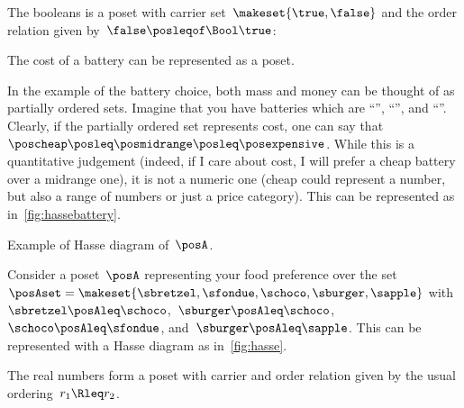 \begin{example}[Booleans]
    \label{ex:bool}
    The booleans \index{\Bool} is a poset with carrier set~$\makeset{\true,\false}$ and the order relation given by~$\false \posleqof\Bool \true$:
\end{example}

\begin{example}

    \begin{marginfigure}
        \centering
        \caption{The cost of a battery can be represented as a poset.
        }
        \label{fig:hassebattery}
    \end{marginfigure}

    In the example of the battery choice, both mass and money can be thought of as partially ordered sets.
    Imagine that you have batteries which are ``\poscheap'', ``\posmidrange'', and ``\posexpensive''.
    Clearly, if the partially ordered set represents cost, one can say that~$\poscheap \posleq\posmidrange \posleq\posexpensive$.
    While this is a quantitative judgement (indeed, if I care about cost, I will prefer a cheap battery over a midrange one), it is not a numeric one (cheap could represent a number, but also a range of numbers or just a price category).
    This can be represented as in~\cref{fig:hassebattery}.
\end{example}

\begin{marginfigure}
    \centering
    \caption{Example of Hasse diagram of~$\posA$.}
    \label{fig:hasse}
\end{marginfigure}
\begin{example}
    Consider a poset~$\posA$ representing your food preference over the set~$\posAset=\makeset{\sbretzel,\sfondue,\schoco,\sburger,\sapple}$ with~$\sbretzel\posAleq \schoco$,~$\sburger\posAleq \schoco$,~$\schoco\posAleq \sfondue$, and~$\sburger\posAleq \sapple$.
    This can be represented with a Hasse diagram as in~\cref{fig:hasse}.
\end{example}

\begin{example}[Reals]
    The real numbers \reals form a poset with carrier \reals and order relation given by the usual ordering~$r_1 \Rleq r_2$.
\end{example}

\vfill\clearpage

